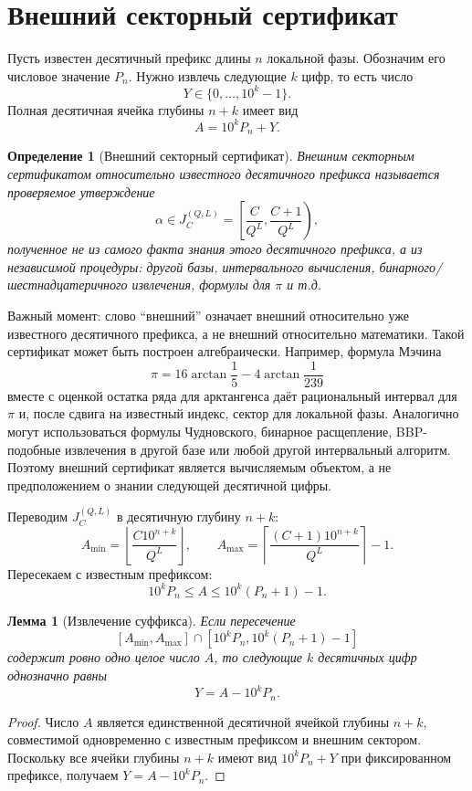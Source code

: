\documentclass[11pt,a4paper]{article}
\newtheorem{definition}{Определение}
\newtheorem{lemma}{Лемма}
\begin{document}
\section{Внешний секторный сертификат}

Пусть известен десятичный префикс длины $n$ локальной фазы.  Обозначим его числовое значение $P_n$.  Нужно извлечь следующие $k$ цифр, то есть число
\[
  Y\in\{0,\dots,10^k-1\}.
\]
Полная десятичная ячейка глубины $n+k$ имеет вид
\[
  A=10^kP_n+Y.
\]

\begin{definition}[Внешний секторный сертификат]
Внешним секторным сертификатом относительно известного десятичного префикса называется проверяемое утверждение
\[
  \alpha\in J_C^{(Q,L)}=\left[\frac{C}{Q^L},\frac{C+1}{Q^L}\right),
\]
полученное не из самого факта знания этого десятичного префикса, а из независимой процедуры: другой базы, интервального вычисления, бинарного/шестнадцатеричного извлечения, формулы для $\pi$ и т.д.
\end{definition}

Важный момент: слово ``внешний'' означает внешний относительно уже известного десятичного префикса, а не внешний относительно математики.  Такой сертификат может быть построен алгебраически.  Например, формула Мэчина
\[
  \pi=16\arctan\frac15-4\arctan\frac1{239}
\]
вместе с оценкой остатка ряда для арктангенса даёт рациональный интервал для $\pi$ и, после сдвига на известный индекс, сектор для локальной фазы.  Аналогично могут использоваться формулы Чудновского, бинарное расщепление, BBP-подобные извлечения в другой базе или любой другой интервальный алгоритм.  Поэтому внешний сертификат является вычисляемым объектом, а не предположением о знании следующей десятичной цифры.

Переводим $J_C^{(Q,L)}$ в десятичную глубину $n+k$:
\[
  A_{\min}=\left\lfloor\frac{C10^{n+k}}{Q^L}\right\rfloor,
  \qquad
  A_{\max}=\left\lceil\frac{(C+1)10^{n+k}}{Q^L}\right\rceil-1.
\]
Пересекаем с известным префиксом:
\[
  10^kP_n\le A\le 10^k(P_n+1)-1.
\]

\begin{lemma}[Извлечение суффикса]
Если пересечение
\[
  [A_{\min},A_{\max}]
  \cap
  [10^kP_n,10^k(P_n+1)-1]
\]
содержит ровно одно целое число $A$, то следующие $k$ десятичных цифр однозначно равны
\[
  \boxed{Y=A-10^kP_n.}
\]
\end{lemma}

\begin{proof}
Число $A$ является единственной десятичной ячейкой глубины $n+k$, совместимой одновременно с известным префиксом и внешним сектором.  Поскольку все ячейки глубины $n+k$ имеют вид $10^kP_n+Y$ при фиксированном префиксе, получаем $Y=A-10^kP_n$.
\end{proof}
\end{document}
